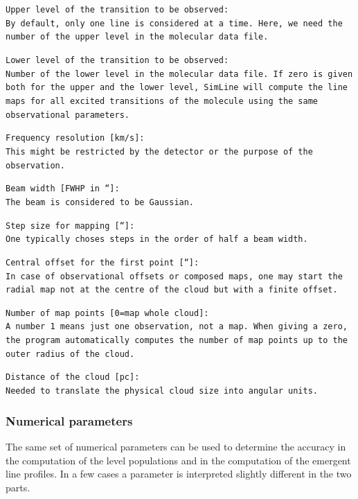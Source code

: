 \begin{description}
\item{}\tt Upper level of the transition to be observed:\\ \rm
By default, only one line is considered at a time. Here, we need the number of
the upper level in the molecular data file.
\item{}\tt Lower level of the transition to be observed:\\ \rm
Number of the lower level in the molecular data file.
If zero is given both for the upper and the lower level, SimLine will
compute the line maps for all excited transitions of the molecule 
using the same observational parameters.
\item{}\tt Frequency resolution [km/s]:\\ \rm
This might be restricted by the detector or the purpose of the observation. 
\item{}\tt Beam width [FWHP in ``]: \\ \rm
The beam is considered to be Gaussian.
\item{}\tt Step size for mapping [``]: \\ \rm
One typically choses steps in the order of half a beam width.
\item{}\tt Central offset for the first point [``]: \\ \rm
In case of observational offsets or composed maps, one may start 
the radial map not at the centre of the cloud but with a finite offset.
\item{}\tt Number of map points [0=map whole cloud]: \\ \rm
A number 1 means just one observation, not a map. When giving a
zero, the program automatically computes the number of map points
up to the outer radius of the cloud.
\item{}\tt Distance of the cloud [pc]: \\ \rm
Needed to translate the physical cloud size into angular units.
\end{description}

\subsubsection{Numerical parameters}

The same set of numerical parameters can be used to determine the 
accuracy in the computation of the level populations and in the computation
of the emergent line profiles. In a few cases a parameter is interpreted
slightly different in the two parts.


